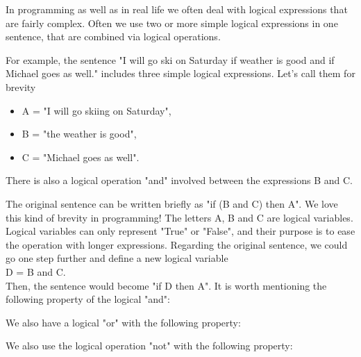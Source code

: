 \documentclass[article,A4,12pt]{llncs}
\begin{document}
{{{{In programming as well as in real life we often deal with logical expressions that are 
fairly complex. Often we use two or more simple logical expressions in one sentence, that 
are combined via logical operations.

For example, the sentence "I will go ski on Saturday if weather is good and if 
Michael goes as well." includes three simple logical expressions. Let's call 
them for brevity

\begin{itemize}
\item A = "I will go skiing on Saturday",
\item B = "the weather is good",
\item C = "Michael goes as well".  
\end{itemize}
There is also a logical operation "and" involved between the expressions B and C.

The original sentence can be written briefly as "if (B and C) then A". We love this kind of 
brevity in programming! The letters A, B and C are logical variables. Logical variables 
can only represent "True" or "False", and their purpose is to ease the operation with 
longer expressions.
Regarding the original sentence, we could go one step further and define a new logical variable\\

\noindent
D = B and C.\\

\noindent
Then, the sentence would become "if D then A". It is worth mentioning the following 
property of the logical "and":\\

\begin{center}
\end{center}
\vspace{4mm}
\noindent
We also have a logical "or" with the following property:\\

\begin{center}
\end{center}
\vspace{4mm}
\noindent
We also use the logical operation "not" with the following property:\\

\begin{center}
\end{center}


}}}}
\end{document}
